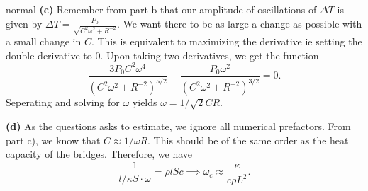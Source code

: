 \begin{solution}{normal}
\noindent \textbf{(c)} Remember from part b that our amplitude of oscillations of $\Delta T$ is given by $\Delta T = \frac{P_0}{\sqrt{C^2\omega^2 + R^{-2}}}$. We want there to be as large a change as possible with a small change in $C$. This is equivalent to maximizing the derivative ie setting the double derivative to $0$. Upon taking two derivatives, we get the function
\[\frac{3P_0 C^2 \omega^4}{(C^2 \omega^2 + R^{-2})^{5/2}} - \frac{P_0 \omega^2}{(C^2 \omega^2 + R^{-2})^{3/2}} = 0.\]
Seperating and solving for $\omega$ yields $\omega = 1/\sqrt{2}CR$.
\vspace{3mm}

\noindent \textbf{(d)} As the questions asks to estimate, we ignore all numerical prefactors. From part c), we know that $C \approx 1/\omega R$. This should be of the same order as the heat capacity of the bridges. Therefore, we have 
\[\frac{1}{l/\kappa S\cdot \omega} = \rho lSc\implies \omega_c \approx \frac{\kappa}{c\rho L^2}.\]
\end{solution}